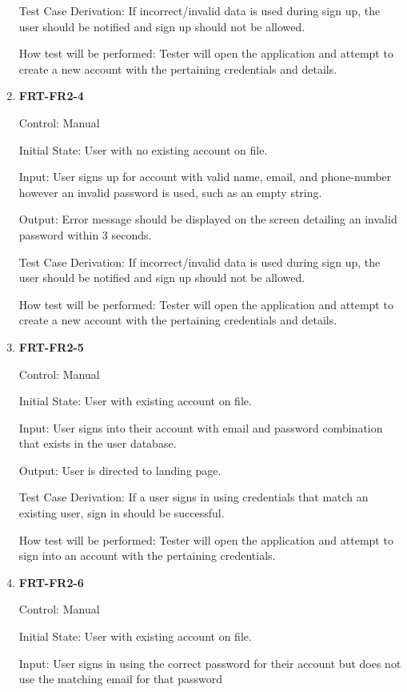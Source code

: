 \documentclass[12pt, titlepage]{article}
\begin{document}
\begin{enumerate}
Test Case Derivation: If incorrect/invalid data is used during sign up, the user should be notified and sign up should
not be allowed.

How test will be performed: Tester will open the application and attempt to create a new account with the pertaining credentials and details. 

\item{\textbf{FRT-FR2-4}}

Control: Manual
          
Initial State: User with no existing account on file.
          
Input: User signs up for account with valid name, email, and phone-number however an invalid password
is used, such as an empty string.
          
Output: Error message should be displayed on the screen detailing an invalid password within 3 seconds.

Test Case Derivation: If incorrect/invalid data is used during sign up, the user should be notified and sign up should
not be allowed.

How test will be performed: Tester will open the application and attempt to create a new account with the pertaining credentials and details. 

\item{\textbf{FRT-FR2-5}}

Control: Manual
          
Initial State: User with existing account on file.
          
Input: User signs into their account with email and password combination that exists in the user database.
          
Output: User is directed to landing page.

Test Case Derivation: If a user signs in using credentials that match an existing user, sign in should be successful.
          
How test will be performed: Tester will open the application and attempt to sign into an account with the pertaining credentials.
          
\item{\textbf{FRT-FR2-6}}

Control: Manual
          
Initial State: User with existing account on file.
          
Input: User signs in using the correct password for their account but does not use the matching email for that password
          

\end{enumerate}
\end{document}

